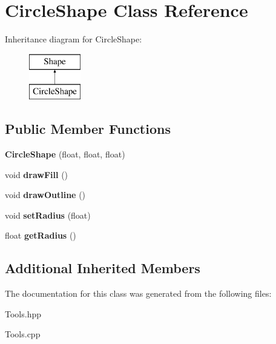 \hypertarget{class_circle_shape}{}\section{Circle\+Shape Class Reference}
\label{class_circle_shape}
Inheritance diagram for Circle\+Shape\+:\begin{figure}[H]
\begin{center}
\leavevmode
\includegraphics[height=2.000000cm]{class_circle_shape}
\end{center}
\end{figure}
\subsection*{Public Member Functions}
\begin{DoxyCompactItemize}
\item 
\hypertarget{class_circle_shape_a4e5614b889576afbd5c744ca39129a73}{}\label{class_circle_shape_a4e5614b889576afbd5c744ca39129a73} 
{\bfseries Circle\+Shape} (float, float, float)
\item 
\hypertarget{class_circle_shape_a4bdbdab71c47dd560ba58b4d21659be1}{}\label{class_circle_shape_a4bdbdab71c47dd560ba58b4d21659be1} 
void {\bfseries draw\+Fill} ()
\item 
\hypertarget{class_circle_shape_a42fe963aa4872668748f0ba882f49878}{}\label{class_circle_shape_a42fe963aa4872668748f0ba882f49878} 
void {\bfseries draw\+Outline} ()
\item 
\hypertarget{class_circle_shape_af317d58be28370ba183df07734fde939}{}\label{class_circle_shape_af317d58be28370ba183df07734fde939} 
void {\bfseries set\+Radius} (float)
\item 
\hypertarget{class_circle_shape_a931eb9fffe6985d45717bf8175960503}{}\label{class_circle_shape_a931eb9fffe6985d45717bf8175960503} 
float {\bfseries get\+Radius} ()
\end{DoxyCompactItemize}
\subsection*{Additional Inherited Members}


The documentation for this class was generated from the following files\+:\begin{DoxyCompactItemize}
\item 
Tools.\+hpp\item 
Tools.\+cpp\end{DoxyCompactItemize}
